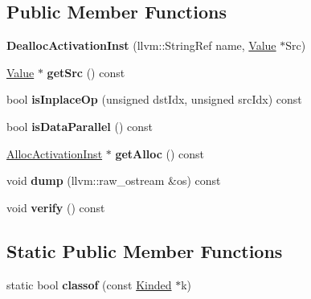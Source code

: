 \subsection*{Public Member Functions}
\begin{DoxyCompactItemize}
\item 
\mbox{\label{classglow_1_1_dealloc_activation_inst_ab62eb65fd0b4474f5863f7c142fca2fa}} 
{\bfseries Dealloc\+Activation\+Inst} (llvm\+::\+String\+Ref name, \hyperlink{classglow_1_1_value}{Value} $\ast$Src)
\item 
\mbox{\label{classglow_1_1_dealloc_activation_inst_ae878c1197bbfe91daea7036de09b2294}} 
\hyperlink{classglow_1_1_value}{Value} $\ast$ {\bfseries get\+Src} () const
\item 
\mbox{\label{classglow_1_1_dealloc_activation_inst_af5e3b42b1d0bc3bab2ea1eacdadad8ab}} 
bool {\bfseries is\+Inplace\+Op} (unsigned dst\+Idx, unsigned src\+Idx) const
\item 
\mbox{\label{classglow_1_1_dealloc_activation_inst_af357dec2f0cafd7890b1f9e4249e2e75}} 
bool {\bfseries is\+Data\+Parallel} () const
\item 
\mbox{\label{classglow_1_1_dealloc_activation_inst_ac851c6e6e29d078abe7a12175169401e}} 
\hyperlink{classglow_1_1_alloc_activation_inst}{Alloc\+Activation\+Inst} $\ast$ {\bfseries get\+Alloc} () const
\item 
\mbox{\label{classglow_1_1_dealloc_activation_inst_a37adb31e44ab5593be56a103bba4b5dc}} 
void {\bfseries dump} (llvm\+::raw\+\_\+ostream \&os) const
\item 
\mbox{\label{classglow_1_1_dealloc_activation_inst_a9e3ef886099cdb7a955d0482ee3dd77e}} 
void {\bfseries verify} () const
\end{DoxyCompactItemize}
\subsection*{Static Public Member Functions}
\begin{DoxyCompactItemize}
\item 
\mbox{\label{classglow_1_1_dealloc_activation_inst_ac77d6235f4c23cb42b070e7f8559c30c}} 
static bool {\bfseries classof} (const \hyperlink{classglow_1_1_kinded}{Kinded} $\ast$k)
\end{DoxyCompactItemize}
